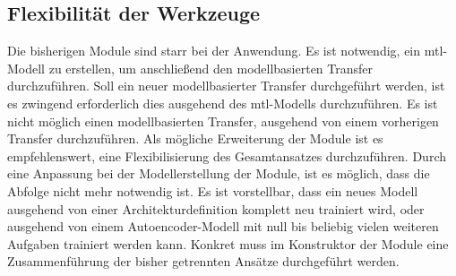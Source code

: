 	\subsection{Flexibilität der Werkzeuge}
	\label{subsec:FlexibilitätDerWerkzeuge}
	Die bisherigen Module sind starr bei der Anwendung. Es ist notwendig, ein \acl{mtl}-Modell zu erstellen, um anschließend den modellbasierten Transfer durchzuführen. Soll ein neuer modellbasierter Transfer durchgeführt werden, ist es zwingend erforderlich dies ausgehend des \acl{mtl}-Modells durchzuführen. Es ist nicht möglich einen modellbasierten Transfer, ausgehend von einem vorherigen Transfer durchzuführen. 
	Als mögliche Erweiterung der Module ist es empfehlenswert, eine Flexibilisierung des Gesamtansatzes durchzuführen. Durch eine Anpassung bei der Modellerstellung der Module, ist es möglich, dass die Abfolge nicht mehr notwendig ist. Es ist vorstellbar, dass ein neues Modell ausgehend von einer Architekturdefinition komplett neu trainiert wird, oder ausgehend von einem Autoencoder-Modell mit null bis beliebig vielen weiteren Aufgaben trainiert werden kann. Konkret muss im Konstruktor der Module eine Zusammenführung der bisher getrennten Ansätze durchgeführt werden.     


	   